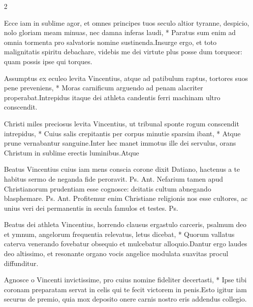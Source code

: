 \begin{multicols*}{2}
\begin{responsory}
{Ecce iam in sublime agor, et omnes principes tuos seculo altior tyranne, despicio, nolo gloriam meam minuas, nec damna inferas laudi, * Paratus sum enim ad omnia tormenta pro salvatoris nomine sustinenda.}{Insurge ergo, et toto malignitatis spiritu debachare, videbis me dei virtute plus posse dum torqueor: quam possis ipse qui torques.}
\end{responsory}%
\begin{responsory}
{Assumptus ex eculeo levita Vincentius, atque ad patibulum raptus, tortores suos pene preveniens, * Moras carnificum arguendo ad penam alacriter properabat.}{Intrepidus itaque dei athleta candentis ferri machinam ultro conscendit.}
\end{responsory}%
\begin{responsory-final}
{Christi miles preciosus levita Vincentius, ut tribunal sponte rogum conscendit intrepidus, * Cuius salis crepitantis per corpus minutie sparsim ibant, * Atque prune vernabantur sanguine.}{Inter hec manet immotus ille dei servulus, orans Christum in sublime erectis luminibus.}{Atque}
\end{responsory-final}%
 Beatus Vincentius cuius iam mens conscia corone dixit Datiano, hactenus a te habitus sermo de neganda fide peroravit. {\color{Red} Ps.}  {\color{Red} Ant.} Nefarium tamen apud Christianorum prudentiam esse cognosce: deitatis cultum abnegando blasphemare. {\color{Red} Ps.}  {\color{Red} Ant.} Profitemur enim Christiane religionis nos esse cultores, ac unius veri dei permanentis in secula famulos et testes. {\color{Red} Ps.} 
\begin{responsory}
{Beatus dei athleta Vincentius, horrendo clausus ergastulo carceris, psalmum deo et ymnum, angelorum frequentia relevatus, letus dicebat, * Quorum vallatus caterva venerando fovebatur obsequio et mulcebatur alloquio.}{Dantur ergo laudes deo altissimo, et resonante organo vocis angelice modulata suavitas procul diffunditur.}
\end{responsory}%
\begin{responsory}
{Agnosce o Vincenti invictissime, pro cuius nomine fideliter decertasti, * Ipse tibi coronam preparatam servat in celis qui te fecit victorem in penis.}{Esto igitur iam securus de premio, quia mox deposito onere carnis nostro eris addendus collegio.}
\end{responsory}%

\end{multicols*}
